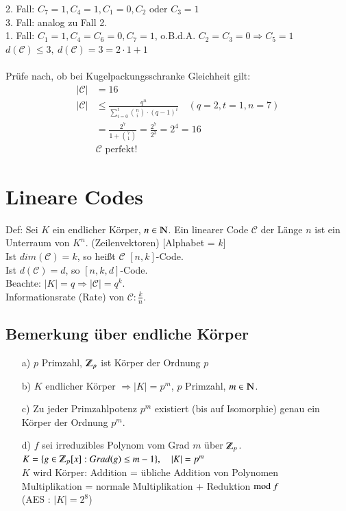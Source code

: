 2. Fall: $C_7=1,C_4=1,C_1=0,C_2 \text{ oder } C_3=1$ \\
3. Fall: analog zu Fall 2.\\
1. Fall: $C_1=1,C_4=C_6=0, C_7=1$, o.B.d.A. $C_2=C_3=0 \Rightarrow C_5=1$\\
$d(\mathcal{C}) \leq 3,\ d(\mathcal{C})=3=2 \cdot 1 + 1$\\
\\
Pr\"ufe nach, ob bei Kugelpackungsschranke Gleichheit gilt:
\begin{align*}
	\left|\mathcal{C}\right| &=16\\
	\left|\mathcal{C}\right| &\leq \frac{q^n}{\sum_{i=0}^t \binom{n}{i} \cdot (q-1)^i} \quad (q=2, t=1, n=7)\\
	&=\frac{2^7}{1+\binom{7}{1}}=\frac{2^7}{2^3}=2^4=16\\
	&\mathcal{C}\text{ perfekt!}
\end{align*}

\section{Lineare Codes}
Def: Sei $K$ ein endlicher K\"orper, $n \in \N$. Ein linearer Code $\mathcal{C}$ der L\"ange $n$ ist ein Unterraum von $K^n$. (Zeilenvektoren) [Alphabet = $k$] \\
Ist $dim(\mathcal{C})=k$, so hei\ss t $\mathcal{C}$ $\left[n,k\right]$-Code.\\
Ist $d(\mathcal{C})=d$, so $\left[ n,k,d \right]$-Code. \\
Beachte: $\left| K \right| = q \Rightarrow \left| \mathcal{C} \right| =q^k$.\\
Informationsrate (Rate) von $\mathcal{C}: \frac{k}{n}$.\\
\subsection{Bemerkung \"uber endliche K\"orper}
\begin{itemize}
	\item[a)] $p$ Primzahl, $\Z_p$ ist K\"orper der Ordnung $p$
	\item[b)] $K$ endlicher K\"orper $\Rightarrow \left| K \right| = p^m$, $p$ Primzahl, $m \in \N$.
	\item[c)] Zu jeder Primzahlpotenz $p^m$ existiert (bis auf Isomorphie) genau ein K\"orper der Ordnung $p^m$.
	\item[d)] $f$ sei irreduzibles Polynom vom Grad $m$ \"uber $\Z_p$. $K=\lbrace g \in \Z_p [x] : Grad(g) \leq m-1 \rbrace, \quad \left| K \right| = p^m$\\
	$K$ wird K\"orper: Addition = \"ubliche Addition von Polynomen \\
	Multiplikation = normale Multiplikation + Reduktion $\text{mod }f$ \\
	(AES : $\left| K \right| = 2^8$)
\end{itemize}

